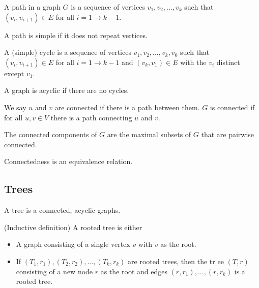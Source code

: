 \begin{definition}
    A path in a graph $G$ is a sequence of vertices $v_1, v_2, ...,
    v_k$ such that $(v_i, v_{i+1}) \in E$ for all $i = 1 \to k - 1$.
\end{definition}

\begin{definition}
    A path is simple if it does not repeat vertices.
\end{definition}

\begin{definition}
    A (simple) cycle is a sequence of vertices $v_1, v_2, ...,
    v_k, v_0$ such that $(v_i, v_{i+1}) \in E$ for all $i = 1 \to k -
    1$ and $(v_k, v_1) \in E$ with the $v_i$ distinct except $v_1$.
\end{definition}

\begin{definition}
    A graph is acyclic if there are no cycles.
\end{definition}

\begin{definition}
    We say $u$ and $v$ are connected if there is a path between them.
    $G$ is connected if for all $u, v \in V$ there is a path
    connecting $u$ and $v$.
\end{definition}

\begin{definition}
    The connected components of $G$ are the maximal subsets of $G$
    that are pairwise connected.
\end{definition}

\begin{remark}
    Connectedness is an equivalence relation.
\end{remark}

\subsection{Trees}

\begin{definition}
    A tree is a connected, acyclic graphs.
\end{definition}

\begin{definition}
    (Inductive definition) A rooted tree is either
    \begin{itemize}
        \item A graph consisting of a single vertex $v$ with $v$ as
        the root.
        \item If $(T_1, r_1), (T_2, r_2), ..., (T_k, r_k)$ are rooted
        trees, then the tr ee $(T, r)$ consisting of a new node $r$ as
        the root and edges $(r, r_1), ..., (r, r_k)$ is a rooted tree.
    \end{itemize}
\end{definition}

